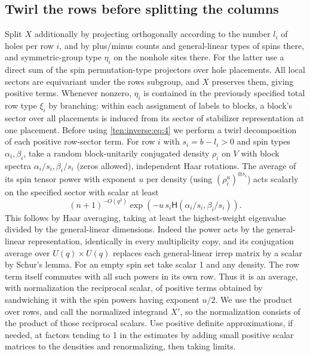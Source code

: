 \subsection{Twirl the rows before splitting the columns}
Split \(X\) additionally by projecting orthogonally according to the number \(l_i\) of holes per row \(i\), and by plus/minus counts and general-linear types of spins there, and symmetric-group type \(\eta_i\) on the nonhole sites there. For the latter use a direct sum of the spin permutation-type projectors over hole placements. All local sectors are equivariant under the rows subgroup, and \(X\) preserves them, giving positive terms. Whenever nonzero, \(\eta_i\) is contained in the previously specified total row type \(\xi_i\) by branching: within each assignment of labels to blocks, a block's sector over all placements is induced from its sector of stabilizer representation at one placement. Before using \eqref{ten:inverse:eq:4} we perform a twirl decomposition of each positive row-sector term. For row \(i\) with \(s_i=b-l_i>0\) and spin types \(\alpha_i,\beta_i\), take a random block-unitarily conjugated density \(\rho_i\) on \(V\) with block spectra \(\alpha_i/s_i,\beta_i/s_i\) (zeros allowed), independent Haar rotations. The average of its spin tensor power with exponent \(u\) per density (using \((\rho_i^u)^{\otimes s_i}\)) acts scalarly on the specified sector with scalar at least
\[
 (n+1)^{-O(q^2)}\exp(-u\, s_i\mathsf H(\alpha_i/s_i,\beta_i/s_i)).
\]
This follows by Haar averaging, taking at least the highest-weight eigenvalue divided by the general-linear dimensions. Indeed the power acts by the general-linear representation, identically in every multiplicity copy, and its conjugation average over \(U(q)\times U(q)\) replaces each general-linear irrep matrix by a scalar by Schur's lemma. For an empty spin set take scalar 1 and any density. The row term itself commutes with all such powers in its own row. Thus it is an average, with normalization the reciprocal scalar, of positive terms obtained by sandwiching it with the spin powers having exponent \(u/2\). We use the product over rows, and call the normalized integrand \(X'\), so the normalization consists of the product of those reciprocal scalars. Use positive definite approximations, if needed, at factors tending to 1 in the estimates by adding small positive scalar matrices to the densities and renormalizing, then taking limits.

